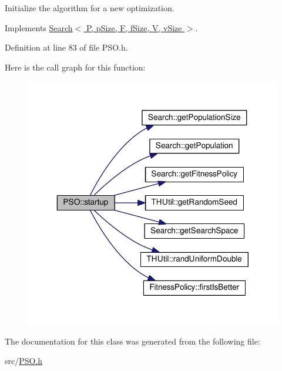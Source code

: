 Initialize the algorithm for a new optimization. 



Implements \hyperlink{classSearch_afe8c2a6dd96ad12f77de7c8226a76028}{Search$<$ P, p\+Size, F, f\+Size, V, v\+Size $>$}.



Definition at line 83 of file P\+S\+O.\+h.



Here is the call graph for this function\+:
\nopagebreak
\begin{figure}[H]
\begin{center}
\leavevmode
\includegraphics[width=343pt]{classPSO_a8fb3e9a46396074cbbdc2d04a83783a5_cgraph}
\end{center}
\end{figure}




The documentation for this class was generated from the following file\+:\begin{DoxyCompactItemize}
\item 
src/\hyperlink{PSO_8h}{P\+S\+O.\+h}\end{DoxyCompactItemize}
